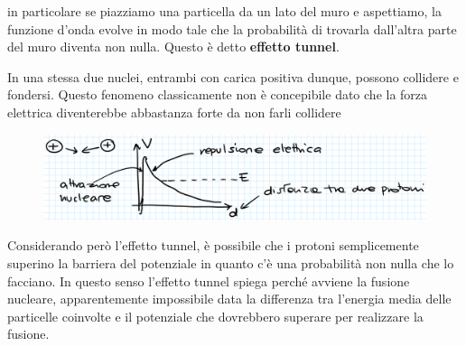 \noindent
in particolare se piazziamo una particella da un lato del muro e aspettiamo, la funzione d'onda evolve in modo tale che la probabilit\`a di trovarla dall'altra parte del muro diventa non nulla. Questo \`e detto \textbf{effetto tunnel}.

\begin{example}
In una stessa due nuclei, entrambi con carica positiva dunque, possono collidere e fondersi. Questo fenomeno classicamente non \`e concepibile dato che la forza elettrica diventerebbe abbastanza forte da non farli collidere

\begin{figure}[!htb]
    \centering
    \includegraphics[width=12cm]{images/Fusione_nucleare.png}
\end{figure}

\noindent Considerando per\`o l'effetto tunnel, \`e possibile che i protoni semplicemente superino la barriera del potenziale in quanto c'\`e una probabilit\`a non nulla che lo facciano. In questo senso l'effetto tunnel spiega perch\'e avviene la fusione nucleare, apparentemente impossibile data la differenza tra l'energia media delle particelle coinvolte e il potenziale che dovrebbero superare per realizzare la fusione.
\end{example}
